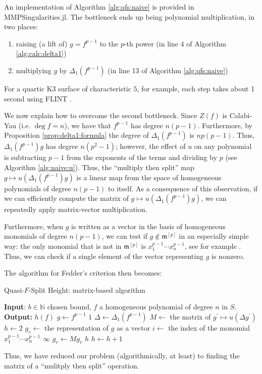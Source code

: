 An implementation of Algorithm \ref{alg:qfs:naive}
is provided in MMPSingularities.jl.
The bottleneck ends up being polynomial multiplication, 
in two places:
\begin{enumerate}[(1)]
    \item raising (a lift of) \(g = f^{p-1}\) to the \(p\)-th power 
        (in line 4 of Algorithm \ref{alg:calc:delta1})
    \item multiplying \(g\) by \(\Delta_{1}(f^{p-1})\) 
        (in line 13 of Algorithm \ref{alg:qfs:naive})
\end{enumerate}

\noindent For a quartic K3 surface of characteristic \(5\),
for example, each step takes about 1 second 
using FLINT \cite{flint-2023-flint}. 

We now explain how to overcome the second
bottleneck. Since \(Z(f)\) is Calabi-Yau
(i.e. \(\deg f = n\)), we have that \(f^{p-1}\) has degree
\(n(p-1)\). 
Furthermore, by Proposition \ref{prop:delta1:formula}
the degree of \(\Delta_{1}(f^{p-1})\) 
is \(np(p - 1)\).
Thus, \(\Delta_{1}(f^{p-1})g\) has degree
\(n(p^{2} - 1)\); however, the effect 
of \(u\) on any polynomial is subtracting \(p-1\)
from the exponents of the terms and dividing by \(p\) 
(see Algorithm \ref{alg:naive:u}).
Thus, the ``multiply then split'' map 
\(g \mapsto u(\Delta_{1}(f^{p-1}) g)\) 
is a linear map from 
the space of homogeneous polynomials of degree \(n(p-1)\) 
to itself.
As a consequence of this observation,
if we can efficiently compute the matrix of 
\(g \mapsto u(\Delta_{1}(f^{p-1})g)\),
we can repeatedly apply matrix-vector multiplication.

Furthermore, when \(g\) is written as a vector 
in the basis of homogeneous monomials of degree
\(n(p-1)\), we can test if \(g \notin \mathfrak{m}^{[p]}\) 
in an especially simple way: the only 
monomial that is not in \(\mathfrak{m}^{[p]}\) is
\(x_{1}^{p-1}\cdots x_{n}^{p-1}\), 
see for example \cite{kty-2022-fedder}.
Thus, we can check if a single element of the vector representing
\(g\) is nonzero.

The algorithm for Fedder's criterion then becomes:

\begin{algorithm}[H]
\caption{Quasi-\(F\)-Split Height: matrix-based algorithm}
\label{alg:qfs:matrix}
\begin{algorithmic}[1]
\State \textbf{Input}: \(b \in \mathbb{N}\) chosen bound, \(f\) a homogeneous
	polynomial of degree \(n\) in \(S\).
\State \textbf{Output:} $h(f)$
\State \(g \gets f^{p-1}\) 
    \State \Return \(1\) 
\EndIf
\State \(\Delta \gets \Delta_{1}(f^{p-1})\) 
\State \(M \gets\) the matrix of  \(g^{\prime} \mapsto u(\Delta g^{\prime})\)
\State \(h \gets 2\) 
\State \(g_{v} \gets\) the representation of \(g\) as a vector
\State \(i \gets \) the index of the monomial \(x_{1}^{p-1}\cdots x_{n}^{p-1}\)
        \State \Return \(\infty\)
    \EndIf
    \State \(g_{v} \gets M g_{v}\) 
        \State \Return \(h\) 
    \EndIf
    \State \(h \gets h + 1\)
\EndWhile
\end{algorithmic}
\end{algorithm}

Thus, we have reduced our problem (algorithmically, at least)
to finding the matrix of a ``mulitply then split'' operation.
